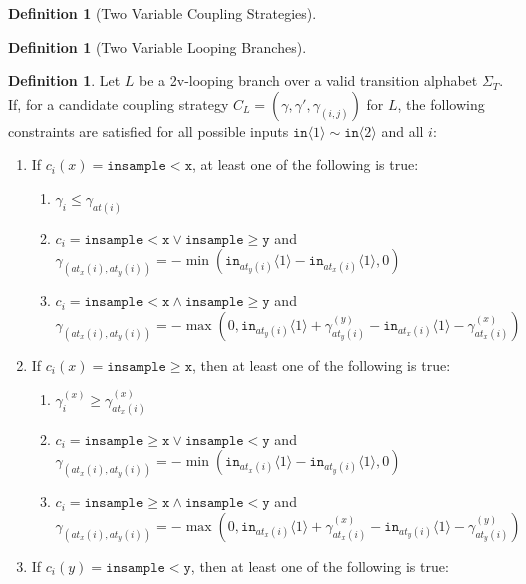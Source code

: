 \documentclass[12pt]{article}
\newcommand{\gguard}[1][x]{\texttt{insample}\geq #1}
\newcommand{\lguard}[1][x]{\texttt{insample} < #1}
\newcommand{\brangle}[1]{\langle #1 \rangle}
\theoremstyle{definition}
\newtheorem{defn}[thm]{Definition}
\begin{document}
\begin{defn}[Two Variable Coupling Strategies]
    
\end{defn}

\begin{defn}[Two Variable Looping Branches]
    
\end{defn}

\begin{defn}
    Let $L$ be a 2v-looping branch over a valid transition alphabet $\Sigma_T$. If, for a candidate coupling strategy $C_L = (\gamma, \gamma', \gamma_{(i, j)})$ for $L$, the following constraints are satisfied for all possible inputs $\texttt{in}\brangle{1}\sim\texttt{in}\brangle{2}$ and all $i$: \begin{enumerate}
        \item If $c_i(x) = \lguard[\texttt{x}]$, at least one of the following is true:\begin{enumerate}
            \item $\gamma_i\leq\gamma_{at(i)}$
            \item $c_i = \lguard[\texttt{x}]\lor\gguard[\texttt{y}]$ and $\gamma_{(at_x(i), at_y(i))} = -\min(\texttt{in}_{at_y(i)}\brangle{1}-\texttt{in}_{at_x(i)}\brangle{1}, 0)$
            \item $c_i = \lguard[\texttt{x}]\land\gguard[\texttt{y}]$ and $\gamma_{(at_x(i), at_y(i))} = -\max(0, \texttt{in}_{at_y(i)}\brangle{1}+ \gamma_{at_y(i)}^{(y)}-\texttt{in}_{at_x(i)}\brangle{1}-\gamma_{at_x(i)}^{(x)})$
        \end{enumerate}
        \item If $c_i(x) = \gguard[\texttt{x}]$, then at least one of the following is true: \begin{enumerate}
            \item $\gamma_i^{(x)}\geq \gamma^{(x)}_{at_x(i)}$
            \item $c_i = \gguard[\texttt{x}]\lor\lguard[\texttt{y}]$ and $\gamma_{(at_x(i), at_y(i))} = -\min(\texttt{in}_{at_x(i)}\brangle{1}-\texttt{in}_{at_y(i)}\brangle{1}, 0)$
            \item $c_i = \gguard[\texttt{x}]\land\lguard[\texttt{y}]$ and $\gamma_{(at_x(i), at_y(i))} = -\max(0, \texttt{in}_{at_x(i)}\brangle{1}+ \gamma_{at_x(i)}^{(x)}-\texttt{in}_{at_y(i)}\brangle{1}-\gamma_{at_y(i)}^{(y)})$
        \end{enumerate}
        \item If $c_i(y) = \lguard[\texttt{y}]$, then at least one of the following is true: \begin{enumerate}

\end{enumerate}
\end{enumerate}
\end{defn}
\end{document}
